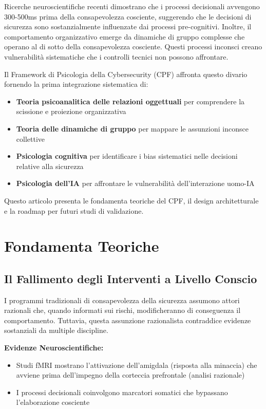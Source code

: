 \documentclass[11pt,a4paper]{article}
\begin{document}
Ricerche neuroscientifiche recenti dimostrano che i processi decisionali avvengono 300-500ms prima della consapevolezza cosciente\cite{libet1983, soon2008}, suggerendo che le decisioni di sicurezza sono sostanzialmente influenzate dai processi pre-cognitivi. Inoltre, il comportamento organizzativo emerge da dinamiche di gruppo complesse che operano al di sotto della consapevolezza cosciente\cite{bion1961, kernberg1998}. Questi processi inconsci creano vulnerabilità sistematiche che i controlli tecnici non possono affrontare.

Il Framework di Psicologia della Cybersecurity (CPF) affronta questo divario fornendo la prima integrazione sistematica di:
\begin{itemize}
\item \textbf{Teoria psicoanalitica delle relazioni oggettuali} per comprendere la scissione e proiezione organizzativa
\item \textbf{Teoria delle dinamiche di gruppo} per mappare le assunzioni inconsce collettive
\item \textbf{Psicologia cognitiva} per identificare i bias sistematici nelle decisioni relative alla sicurezza
\item \textbf{Psicologia dell'IA} per affrontare le vulnerabilità dell'interazione uomo-IA
\end{itemize}

Questo articolo presenta le fondamenta teoriche del CPF, il design architetturale e la roadmap per futuri studi di validazione.

\section{Fondamenta Teoriche}

\subsection{Il Fallimento degli Interventi a Livello Conscio}

I programmi tradizionali di consapevolezza della sicurezza assumono attori razionali che, quando informati sui rischi, modificheranno di conseguenza il comportamento\cite{ajzen1991}. Tuttavia, questa assunzione razionalista contraddice evidenze sostanziali da multiple discipline.

\textbf{Evidenze Neuroscientifiche:}
\begin{itemize}
\item Studi fMRI mostrano l'attivazione dell'amigdala (risposta alla minaccia) che avviene prima dell'impegno della corteccia prefrontale (analisi razionale)\cite{ledoux2000}
\item I processi decisionali coinvolgono marcatori somatici che bypassano l'elaborazione cosciente\cite{damasio1994}
\end{itemize}
\end{document}
